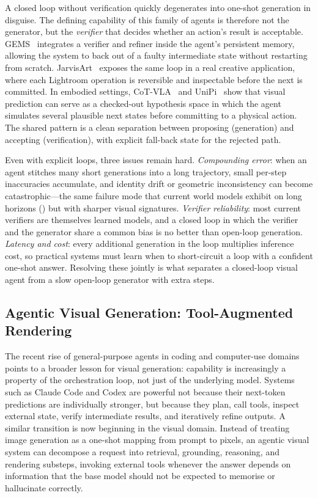 A closed loop without verification quickly degenerates into one-shot generation in disguise. The defining capability of this family of agents is therefore not the generator, but the \emph{verifier} that decides whether an action's result is acceptable. GEMS~\citep{he2026gems} integrates a verifier and refiner inside the agent's persistent memory, allowing the system to back out of a faulty intermediate state without restarting from scratch. JarvisArt~\citep{lin2025jarvisart} exposes the same loop in a real creative application, where each Lightroom operation is reversible and inspectable before the next is committed. In embodied settings, CoT-VLA~\citep{zhao2025cotvla} and UniPi~\citep{du2023unipi} show that visual prediction can serve as a checked-out hypothesis space in which the agent simulates several plausible next states before committing to a physical action. The shared pattern is a clean separation between proposing (generation) and accepting (verification), with explicit fall-back state for the rejected path.

Even with explicit loops, three issues remain hard. \emph{Compounding error}: when an agent stitches many short generations into a long trajectory, small per-step inaccuracies accumulate, and identity drift or geometric inconsistency can become catastrophic---the same failure mode that current world models exhibit on long horizons () but with sharper visual signatures. \emph{Verifier reliability}: most current verifiers are themselves learned models, and a closed loop in which the verifier and the generator share a common bias is no better than open-loop generation. \emph{Latency and cost}: every additional generation in the loop multiplies inference cost, so practical systems must learn when to short-circuit a loop with a confident one-shot answer. Resolving these jointly is what separates a closed-loop visual agent from a slow open-loop generator with extra steps.

\subsection{Agentic Visual Generation: Tool-Augmented Rendering}
\label{subsec:agentic_visual_generation}

The recent rise of general-purpose agents in coding and computer-use domains points to a broader lesson for visual generation: capability is increasingly a property of the orchestration loop, not just of the underlying model. Systems such as Claude Code and Codex are powerful not because their next-token predictions are individually stronger, but because they plan, call tools, inspect external state, verify intermediate results, and iteratively refine outputs. A similar transition is now beginning in the visual domain. Instead of treating image generation as a one-shot mapping from prompt to pixels, an agentic visual system can decompose a request into retrieval, grounding, reasoning, and rendering substeps, invoking external tools whenever the answer depends on information that the base model should not be expected to memorise or hallucinate correctly.


